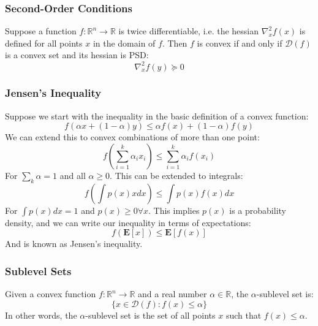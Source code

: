 \documentclass[twoside,twocolumn]{article}
\begin{document}
\subsubsection{Second-Order Conditions}
Suppose a function $f: \mathbb{R}^n \to \mathbb{R}$ is twice differentiable,
i.e. the hessian $\nabla^2_xf(x)$ is defined for all points $x$ in the domain
of $f$. Then $f$ is convex if and only if $\mathcal{D}(f)$ is a convex set and
its hessian is PSD:
\begin{equation}
  \nabla^2_xf(y) \succeq 0
\end{equation}
\subsubsection{Jensen's Inequality}
Suppose we start with the inequality in the basic definition of a convex function:
\begin{equation}
  f(\alpha x + (1-\alpha) y) \leq \alpha f(x) + (1-\alpha) f(y)
\end{equation}
We can extend this to convex combinations of more than one point:
\begin{equation}
  f\left(\sum_{i=1}^k \alpha_i x_i\right) \leq \sum^k_{i=1} \alpha_i f(x_i)
\end{equation}
For $\sum_k \alpha = 1$ and all $\alpha \geq 0$. This can be extended to
integrals:
\begin{equation}
  f \left( \int p ( x ) x d x \right) \leq \int p ( x ) f ( x ) dx
\end{equation}
For $\int p(x)dx = 1$ and $p(x) \geq 0 \forall x$. This implies $p(x)$ is a
probability density, and we can write our inequality in terms of expectations:
\begin{equation}
  f ( \mathbf { E } [ x ] ) \leq \mathbf { E } [ f ( x ) ]
\end{equation}
And is known as Jensen's inequality.
\subsubsection{Sublevel Sets}
Given a convex function $f:\mathbb{R}^n \to \mathbb{R}$ and a real number
$\alpha \in \mathbb{R}$, the $\alpha$-sublevel set is:
\begin{equation}
  \{x \in \mathcal{D}(f): f(x) \leq \alpha\}
\end{equation}
In other words, the $\alpha$-sublevel set is the set of all points $x$
such that $f(x) \leq \alpha$.
\end{document}
